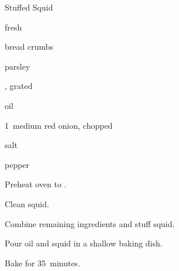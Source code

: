 \begin{recipe}{Stuffed Squid\UNTESTED}{}{}

\begin{ingredients}
\item {} fresh 
\item \C{2\half} bread crumbs
\item {} parsley
\item {} , grated
\item {} oil
\item 1~medium red onion, chopped
\item salt
\item pepper
\end{ingredients}

\begin{directions}
\item Preheat oven to .
\item Clean squid.
\item Combine remaining ingredients and stuff squid.
\item Pour \C{\half} oil and squid in a shallow baking dish.
\item Bake for 35~minutes.
\end{directions}

\end{recipe}
